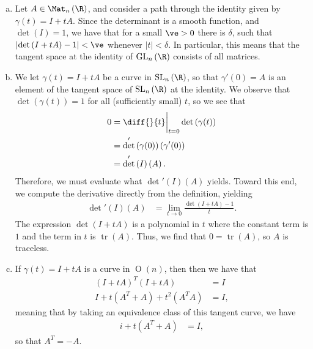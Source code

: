 \documentclass[10pt]{mypackage}
\begin{document}
\begin{solution}\hfill
  \begin{enumerate}[(a)]
    \item Let $A\in \Mat_{n}\left( \R \right)$, and consider a path through the identity given by $\gamma(t) = I + tA$. Since the determinant is a smooth function, and $\det\left( I \right) = 1$, we have that for a small $\ve > 0$ there is $\delta$, such that $ \left\vert \det\left( I + tA \right) - 1 \right\vert < \ve$ whenever $\left\vert t \right\vert < \delta$. In particular, this means that the tangent space at the identity of $ \operatorname{GL}_n\left( \R \right) $ consists of all matrices.
    \item We let $\gamma(t) = I + tA$ be a curve in $ \operatorname{SL}_n\left( \R \right) $, so that $ \gamma'(0) = A $ is an element of the tangent space of $ \operatorname{SL}_n\left( \R \right) $ at the identity. We observe that $\det\left( \gamma(t) \right) = 1$ for all (sufficiently small) $t$, so we see that
      \begin{align*}
        0 &= \diff{}{t}\biggr\vert_{t = 0} \det\left( \gamma(t) \right)\\
          &= \det'\left( \gamma(0) \right)\left( \gamma'(0) \right)\\
          &= \det'\left( I \right)\left( A \right).
      \end{align*}
      Therefore, we must evaluate what $\det'\left( I \right)\left( A \right)$ yields. Toward this end, we compute the derivative directly from the definition, yielding
      \begin{align*}
        \det'\left( I \right)\left( A \right) &= \lim_{t\rightarrow 0} \frac{\det\left( I + tA \right) - 1}{t}.
      \end{align*}
      The expression $\det\left( I + tA \right)$ is a polynomial in $t$ where the constant term is $1$ and the term in $t$ is $\operatorname{tr}\left( A \right)$. Thus, we find that $ 0 = \operatorname{tr}\left( A \right) $, so $A$ is traceless.
    \item If $ \gamma\left( t \right) = I + tA $ is a curve in $ \operatorname{O}(n) $, then then we have that
      \begin{align*}
        \left( I + tA \right)^{T}\left( I + tA \right) &= I\\
        I + t\left( A^{T} + A \right) + t^2\left( A^{T}A \right) &= I,
      \end{align*}
      meaning that by taking an equivalence class of this tangent curve, we have
      \begin{align*}
        i + t\left( A^{T} + A \right) &= I,
      \end{align*}
      so that $A^{T} = -A$.\newline


\end{enumerate}
\end{solution}
\end{document}
